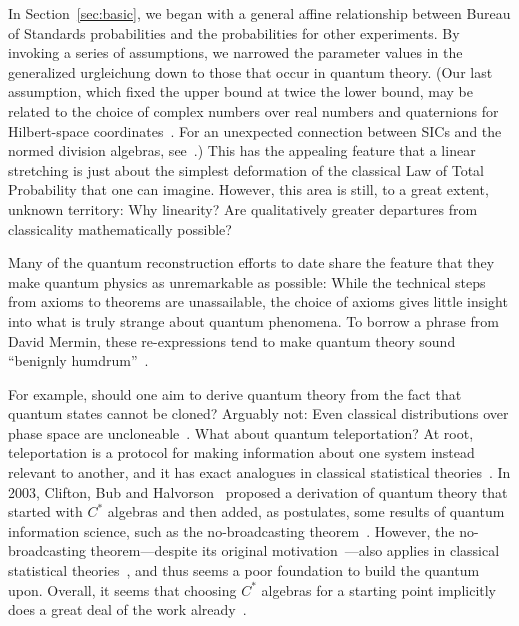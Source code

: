 \documentclass[aps,pra,superscriptaddress,10pt,tightenlines,twocolumn,nofootinbib]{revtex4}
\theoremstyle{remark}
\begin{document}
In Section~\ref{sec:basic}, we began with a general affine
relationship between Bureau of Standards probabilities and the
probabilities for other experiments.  By invoking a series of
assumptions, we narrowed the parameter values in the generalized
urgleichung down to those that occur in quantum theory.  (Our last
assumption, which fixed the upper bound at twice the lower bound, may
be related to the choice of complex numbers over real numbers and
quaternions for Hilbert-space coordinates~\cite{fuchs2009}.  For an
unexpected connection between SICs and the normed division algebras,
see~\cite{stacey-sporadic, stacey-hoggar}.)  This has
the appealing feature that a linear stretching is just about
the simplest deformation of the classical Law of Total Probability
that one can imagine.  However, this area is still, to a great extent,
unknown territory:  Why linearity?  Are qualitatively greater
departures from classicality mathematically possible?

Many of the quantum reconstruction efforts to date share the feature
that they make quantum physics as unremarkable as possible: While the
technical steps from axioms to theorems are unassailable, the choice
of axioms gives little insight into what is truly strange about
quantum phenomena.  To borrow a phrase from David Mermin, these
re-expressions tend to make quantum theory sound ``benignly
humdrum''~\cite{mermin-pillow}.

For example, should one aim to derive quantum theory from the fact
that quantum states cannot be cloned?  Arguably not: Even classical
distributions over phase space are uncloneable~\cite{caves1996}.  What
about quantum teleportation?  At root, teleportation is a protocol for
making information about one system instead relevant to another, and
it has exact analogues in classical statistical
theories~\cite{spekkens2007, bartlett2012, spekkens2014}.  In 2003,
Clifton, Bub and Halvorson~\cite{clifton2003} proposed a derivation of quantum theory
that started with $C^*$ algebras and then added, as postulates, some
results of quantum information science, such as the no-broadcasting
theorem~\cite{barnum1996}.  However, the no-broadcasting
theorem---despite its original
motivation~\cite[p.\ 2235]{Fuchs2014}---also applies in classical
statistical theories~\cite{spekkens2007, bartlett2012, spekkens2014},
and thus seems a poor foundation to build the quantum upon.  Overall,
it seems that choosing $C^*$ algebras for a starting point implicitly
does a great deal of the work already~\cite[p.\ 1125]{Fuchs2014}.
\end{document}
